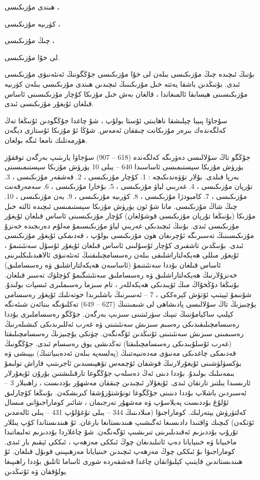 \documentclass[a4paper]{article}
\begin{document}
\begin{flushright}
ھىندى مۇزىكىسى ،

كۈرىيە مۇزىكىسى ،

چىڭ مۇزىكىسى ،

لى خۇا مۇزىكىسى.

بۇنىڭ ئىچىدە چىڭ مۇزىكىسى بىلەن لى خۇا مۇزىكىسى جۇڭگونىڭ ئەنئەنىۋى مۇزىكىسى ئىدى. بۇنىڭدىن باشقا يەتتە خىل مۇزىكىنىڭ ئىچىدىن ھىندى مۇزىكىسى بىلەن كۈرىيە مۇزىكىسىنى ھېسابقا ئالمىغاندا ، قالغان بەش خىل مۇزىكا كۇچار مۇزىكىسىنى ئاساس قىلغان ئۇيغۇر مۇزىكىسى ئىدى.



سۇجاۋا پىيبا چېلىشقا ناھايىتى ئۇستا بولۇپ ، شۇ چاغدا جۇڭگودىن ئۇنىڭغا تەڭ كەلگەندەك بىرەر مۇزىكانت چىققان ئەمەس. شۇڭا ئۇ مۇزىكا ئۇستازى دېگەن ھۆرمەتلىك نامغا ئىگە بولغان.



جۇڭگو تاڭ سۇلالىسى دەۋرىگە كەلگەندە (618 – 907) سۇجاۋا يارىتىپ بەرگەن توققۇز يۈرۈش مۇزىكا سېستىمىسى ئاساسىدا 640 – يىلى 10 يۈرۈش مۇزىكا سېستىمىسىنى بەرپا قىلدى. بۇلار تۆۋەندىكىچە : 1. كۇچار مۇزىكىسى ، 2. قەشقەر مۇزىكىسى ، 3. تۇرپان مۇزىكىسى ، 4. غەربىي لياۋ مۇزىكىسى ، 5. بۇخارا مۇزىكىسى ، 6. سەمەرقەنت مۇزىكىسى ، 7. كامبودژا مۇزىكىسى ، 8. كۈرىيە مۇزىكىسى ، 9. يەن مۇزىكىسى ، 10. چىڭ شاڭ مۇزىكىسى. مانا شۇ ئون يۈرۈش مۇزىكا سېستىمىسى ئىچىدە ئالتە خىل مۇزىكا (بۇنىڭغا تۇرپان مۇزىكىسى قوشۇلغان) كۇچار مۇزىكىسىنى ئاساس قىلغان ئۇيغۇر مۇزىكىسى ئىدى. بۇنىڭ ئىچىدىكى غەربىي لياۋ مۇزىكىسىمۇ مەلۇم دەرىجىدە خەنزۇ مۇزىكىسىنىڭ تەسىرىگە ئۇچرىغان ھون مۇزىكىسى بولۇپ ، قەدىمكى ئۇيغۇر مۇزىكىسى ئىدى. بۇنىڭدىن تاشقىرى كۇچار ئۇسۇلىنى ئاساس قىلغان ئۇيغۇر ئۇسۇل سەنئىتىمۇ ، ئۇيغۇر مىللى ھەيكەلتاراشلىقى بىلەن رەسسامچىلىقنىڭ ئەنئەنىۋى ئالاھىدىلىكلىرىنى ئاساس قىلغان بۇددا سەنئىتىمۇ (ئاساسەن ھەيكەلتاراشلىق ۋە رەسساملىق) خەنزۇلارنىڭ ھەيكەلتاراشلىق ۋە رەسساملىق سەنئىتىگىمۇ كۈچلۈك تەسىر قىلغان. بۇنىڭغا دۇڭخۇاڭ مىڭ ئۆيىدىكى ھەيكەللەر ، تام سىزما رەسىملىرى ئىسپات بولىدۇ. شۇنىمۇ ئېيتىپ ئۆتۈش كېرەككى ، 7 – ئەسىرنىڭ باشلىرىدا خوتەنلىك ئۇيغۇر رەسسامى يۇچىيزىڭ تاڭ سۇلالىسى پادىشاھى لى شىمىننىڭ (627 – 649) تەكلىۋىگە بىنائەن شىئەنگە كېلىپ ساكيامۇننىڭ تىپىك سۈرئىتىنى سىزىپ بەرگەن. جۇڭگو رەسساملىرى بۇددا رەسسامچىلىقىدىكى رەسىم سىزىش سەنئىتىنى ۋە غەرب ئەللىرىدىكى كىشىلەرنىڭ رەسىمىنى سىزىش سەنئىتىنى ئۇنىڭدىن ئۆگەنگەن. چۈنكى يۇچىيزىڭ رەسسامچىلىقتا (غەرب ئۇسلۇبىدىكى رەسسامچىلىقتا) تەڭدىشى يوق رەسسام ئىدى. جۇڭگونىڭ قەدىمكى چاغدىكى مەنىۋى مەدەنىيەتنىڭ (پەلسەپە بىلەن ئەدەبىياتنىڭ) بېيىشى ۋە يۈكسۈلۈشىنى ئۇيغۇرلارنىڭ قوشقان ئۆچمەس تۆھپىسىدىن ئاجرىتىپ قاراش تولىمۇ بىمەنىلىك بولىدۇ. بۇددا دىنى ئەڭ دەسلەپ جۇڭگوغا تارقىلىشتىن بۇرۇن ئۇيغۇرلار ئارىسىدا يىلتىز تارتقان ئىدى. ئۇيغۇلار ئىچىدىن چىققان مەشھۇر بۇددىست ، راھىبلار 3 – ئەسىردىن باشلاپ بۇددا دىنىنى جۇڭگوغا تونۇشتۇرۇشقا كىرىشكەن. بۇنىڭغا كۇچارلىق ئۇلۇغ بۇددىست پەيلاسۇپ ۋە مەشھۇر تەرجىمان ، شائىر كوماراجىۋانى مىسال كەلتۈرۈش يېتەرلىك. كوماراجىۋا (مىلادىنىڭ 344 – يىلى تۇغۇلۇپ 431 – يىلى ئالەمدىن ئۆتكەن) كىچىك ۋاقتىدا دادىسىغا ئەگىشىپ ھىندىستانغا بارغان. ئۇ ھىندىستاندا كۆپ يىللار تۇرۇپ بۇددىزىم ئەقىدىلىرىنى تىرىشىپ ئۆگەنگەن. شۇ چاغلاردا بۇددىزىم تەلىماتىدا ماخىيانا ۋە خىنيايانا دەپ ئاتىلىدىغان چوڭ ئىككى مەزھەپ ، ئىككى ئېقىم بار ئىدى. كوماراجىۋا بۇ ئىككى چوڭ مەزھەپ ئىچىدىن خىنيايانا مەزھىپىنى قوبۇل قىلغان. ئۇ ھىندىستاندىن قايتىپ كېلىۋاتقان چاغدا قەشقەردە شورى ئاساما ئاتلىق بۇددا راھىپىغا يولۇققان ۋە ئۇنىڭدىن 
\end{flushright}
\end{document}
